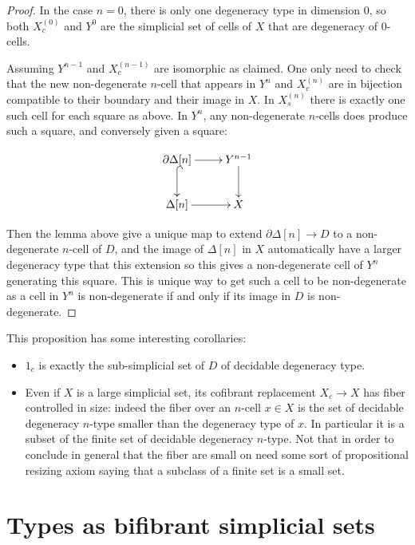 \documentclass[reqno,10pt,a4paper,oneside,draft]{amsart}
\begin{document}
\begin{proof}
In the case $n=0$, there is only one degeneracy type in dimension $0$, so both $X^{(0)}_c$ and $Y^0$ are the simplicial set of cells of $X$ that are degeneracy of $0$-cells.

Assuming $Y^{n-1}$ and $X^{(n-1)}_c$ are isomorphic as claimed. One only need to check that the new non-degenerate $n$-cell that appears in $Y^{n}$ and $X^{(n)}_c$ are in bijection compatible to their boundary and their image in $X$.
In $X^{(n)}_s$ there is exactly one such cell for each square as above. In $Y^{n}$, any non-degenerate $n$-cells does produce such a square, and conversely given a square:

\[ \xymatrix{\partial \Delta[n]  \ar[r] \ar@{^{(}->}[d] & Y^{n-1} \ar[d] \\ \Delta[n]  \ar[r] & X} \]

Then the lemma above give a unique map to extend $\partial \Delta[n] \rightarrow D$ to a non-degenerate $n$-cell of $D$, and the image of $\Delta[n]$ in $X$ automatically have a larger degeneracy type that this extension so this gives a non-degenerate cell of $Y^{n}$ generating this square. This is unique way to get such a cell to be non-degenerate as a cell in $Y^n$ is non-degenerate if and only if its image in $D$ is non-degenerate.

\end{proof}


This proposition has some interesting corollaries:

\begin{itemize}

\item $1_c$ is exactly the sub-simplicial set of $D$ of decidable degeneracy type.

\item Even if $X$ is a large simplicial set, its cofibrant replacement $X_c \rightarrow X$ has fiber controlled in size: indeed the fiber over an $n$-cell $x \in X$ is the set of decidable degeneracy $n$-type smaller than the degeneracy type of $x$. In particular it is a subset of the finite set of decidable degeneracy $n$-type. Not that in order to conclude in general that the fiber are small on need some sort of propositional resizing axiom saying that a subclass of a finite set is a small set.

\end{itemize}



 

\section{Types as bifibrant simplicial sets} 
\end{document}

